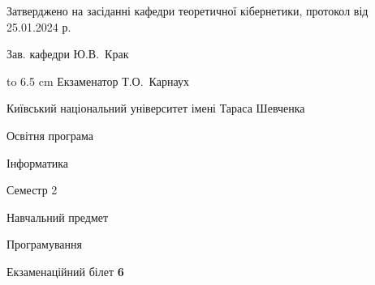 \documentclass[12pt, ukrainian]{article}
\begin{document}
{\smallskip\smallskip \begin {scriptsize} Затверджено на засіданні кафедри теоретичної кібернетики, протокол   від   25.01.2024 р.\par\smallskip\smallskip\smallskip\smallskip
{\parbox {6.5 cm} {Зав. кафедри \dotfill Ю.В.~Крак}}\hspace {0.7cm} {\hbox to 6.5 cm { Екзаменатор \dotfill Т.О.~Карнаух}} \end{scriptsize}}
\newpage
{{\begin {scriptsize}\par
{ \center  Київський національний університет імені Тараса Шевченка \par}
{\parbox {5 cm}{Освітня програма \hfill}{\parbox {7 cm}{Інформатика\hfill}}\parbox {6 cm}{\hfill Семестр 2}}\par
{\parbox {5 cm} {Навчальний предмет \hfill}\parbox {7 cm}{Програмування \hfill}\parbox {6cm}{\hfill}\par}\vspace{-15pt} \end{scriptsize}}{\center Екзаменаційний білет \No \textbf { 6 }\par}}
\end{document}
